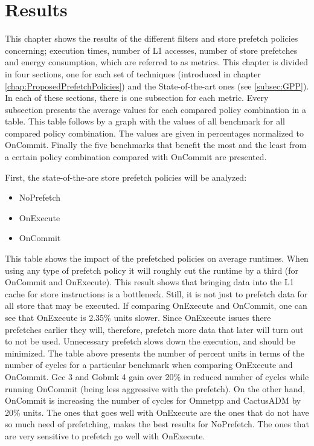 \chapter{Results}
\label{chap:results}

This chapter shows the results of the different filters and store prefetch policies concerning; execution times, number of L1 accesses, number of store prefetches and
energy consumption, which are referred to as metrics. This chapter is divided in four
sections, one for each set of techniques (introduced in chapter \ref{chap:ProposedPrefetchPolicies}) and the State-of-the-art ones (see \ref{subsec:GPP}). In each of these sections, there is one subsection for each
metric. Every subsection presents the average values for each compared policy combination in a table. This table follows by a graph with the values of all benchmark
for all compared policy combination. The values are given in percentages normalized
to OnCommit. Finally the five benchmarks that benefit the most and the least from
a certain policy combination compared with OnCommit are presented.

First, the state-of-the-are store prefetch policies will be analyzed:
\begin{itemize}
    \item NoPrefetch
    \item OnExecute
    \item OnCommit
\end{itemize}
\resExtime
{}
This table shows the impact of the prefetched policies on average runtimes. When
using any type of prefetch policy it will roughly cut the runtime by a third (for
OnCommit and OnExecute). This result shows that bringing data into the L1
cache for store instructions is a bottleneck. Still, it is not just to prefetch data for
all store that may be executed. If comparing OnExecute and OnCommit, one can
see that OnExecute is 2.35\% units slower. Since OnExecute issues there prefetches earlier they will, therefore, prefetch more data that later will turn out to not be used. Unnecessary prefetch slows down the execution, and should be minimized.
The table above presents the number of percent units in terms of the number of
cycles for a particular benchmark when comparing OnExecute and OnCommit. Gcc
3 and Gobmk 4 gain over 20\% in reduced number of cycles while running OnCommit
(being less aggressive with the prefetch). On the other hand, OnCommit is increasing the number of cycles for Omnetpp and CactusADM by 20\% units. The ones that
goes well with OnExecute are the ones that do not have so much need of prefetching,
makes the best results for NoPrefetch. The ones that are very sensitive to prefetch
go well with OnExecute.
\resAcc

